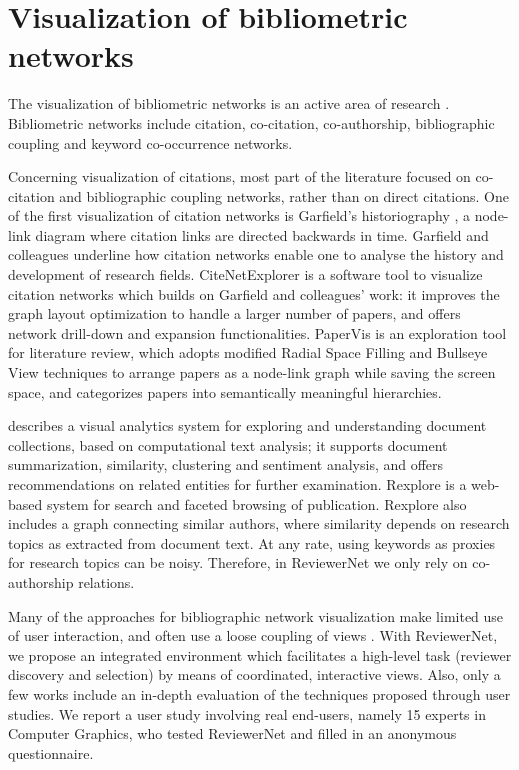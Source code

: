 \section{Visualization of bibliometric networks}
\label{sec:bibvis}
The visualization of bibliometric networks is an active area of research \cite{Ch13,FeHe17}. Bibliometric networks include citation, co-citation, co-authorship, bibliographic coupling and keyword co-occurrence networks. 

Concerning visualization of citations, most part of the literature focused on co-citation and bibliographic coupling networks, rather than on direct citations. One of the first visualization of citation networks is Garfield's historiography \cite{GaPu03}, a node-link diagram where citation links are directed backwards in time. Garfield and colleagues underline how citation networks enable one to analyse the history and development of research fields. CiteNetExplorer \cite{vEWa14} is a software tool to visualize citation networks which builds on Garfield and colleagues' work: it improves the graph layout optimization to handle a larger number of papers, and offers network drill-down and expansion functionalities. PaperVis \cite{ChYa11} is an exploration tool for literature review, which adopts modified Radial Space Filling and Bullseye View techniques to arrange papers as a node-link graph while saving the screen space, and categorizes papers into semantically meaningful hierarchies. 

\cite{GoLi13} describes a visual analytics system for exploring and understanding document collections, based on computational text analysis; it supports document summarization, similarity, clustering and sentiment analysis, and offers recommendations on related entities for further examination. Rexplore \cite{OsMo13} is a web-based system for search and faceted browsing of publication. Rexplore also includes a graph connecting similar authors, where similarity depends on research topics as extracted from document text. At any rate, using keywords as proxies for research topics can be noisy. Therefore, in ReviewerNet we only rely on co-authorship relations.    

Many of the approaches for bibliographic network visualization make limited use of user interaction, and often use a loose coupling of views \cite{FeHe17}. With ReviewerNet, we propose an integrated environment which facilitates a high-level task (reviewer discovery and selection) by means of coordinated, interactive views. Also, only a few works include an in-depth evaluation of the techniques proposed through user studies. We report a user study involving real end-users, namely 15 experts in Computer Graphics, who tested ReviewerNet and filled in an anonymous questionnaire.  



